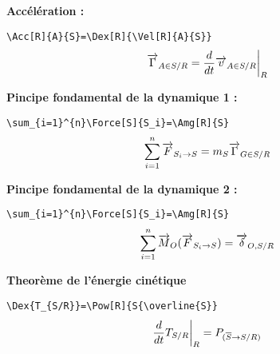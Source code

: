 \documentclass[12pt]{article}
\begin{document}
\textbf{Accélération :}

\verb|\Acc[R]{A}{S}=\Dex[R]{\Vel[R]{A}{S}}|
$$\Acc[R]{A}{S}=\Dex[R]{\Vel[R]{A}{S}}$$

\textbf{Pincipe fondamental de la dynamique 1 :}

\verb|\sum_{i=1}^{n}\Force[S]{S_i}=\Amg[R]{S}|
$$\sum_{i=1}^{n}\Force[S]{S_i}=\Amg[R]{S}$$

\textbf{Pincipe fondamental de la dynamique 2 :}

\verb|\sum_{i=1}^{n}\Force[S]{S_i}=\Amg[R]{S}|
$$\sum_{i=1}^{n}\Moment[S]{S_i}{O}=\ADelta[R]{O}{S}$$

\textbf{Theorème de l'énergie cinétique}

\verb|\Dex{T_{S/R}}=\Pow[R]{S{\overline{S}}|
$$\Dex{T_{S/R}}=\Pow[R]{S}{\overline{S}}$$
\end{document}
